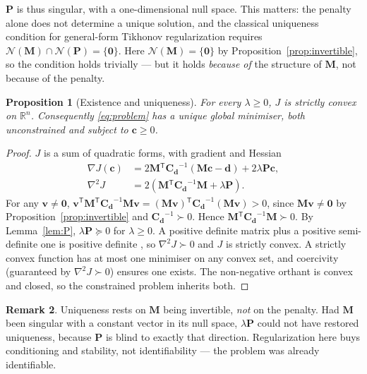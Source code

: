 \documentclass[11pt]{article}
\newcommand{\cvec}{\ensuremath{\mathbf{c}}\xspace}
\newcommand{\dvec}{\ensuremath{\mathbf{d}}\xspace}
\newcommand{\Mmat}{\ensuremath{\mathbf{M}}\xspace}
\newcommand{\Pmat}{\ensuremath{\mathbf{P}}\xspace}
\newcommand{\Cd}{\ensuremath{\mathbf{C}_{\mathbf{d}}}\xspace}
\newcommand{\Reals}{\ensuremath{\mathbb{R}}\xspace}
\newcommand{\transpose}{\ensuremath{^{\mathsf{T}}}}
\newtheorem{theorem}{Proposition}
\theoremstyle{definition}
\newtheorem{remark}[theorem]{Remark}
\begin{document}
\noindent $\Pmat$ is thus singular, with a one-dimensional null space. This matters: the
penalty alone does not determine a unique solution, and the classical uniqueness condition for
general-form Tikhonov regularization \parencite{elden_algorithms_1977,
hansen_rank-deficient_1998} requires
$\mathcal{N}(\Mmat) \cap \mathcal{N}(\Pmat) = \{\bm{0}\}$. Here $\mathcal{N}(\Mmat) =
\{\bm{0}\}$ by Proposition~\ref{prop:invertible}, so the condition holds trivially --- but it holds
\textit{because of} the structure of $\Mmat$, not because of the penalty.

\begin{theorem}[Existence and uniqueness]\label{prop:unique}
For every $\lambda \ge 0$, $J$ is strictly convex on $\Reals^n$. Consequently
\eqref{eq:problem} has a unique global minimiser, both unconstrained and subject to
$\cvec \ge 0$.
\end{theorem}

\begin{proof}
$J$ is a sum of quadratic forms, with gradient and Hessian
\begin{align}
  \nabla J(\cvec) &= 2\Mmat\transpose\Cd^{-1}(\Mmat\cvec - \dvec) + 2\lambda\Pmat\cvec ,
  \label{eq:grad}\\
  \nabla^2 J &= 2\left(\Mmat\transpose\Cd^{-1}\Mmat + \lambda\Pmat\right) .
  \label{eq:hess}
\end{align}
For any $\mathbf{v} \ne \bm{0}$, $\mathbf{v}\transpose\Mmat\transpose\Cd^{-1}\Mmat\mathbf{v} =
(\Mmat\mathbf{v})\transpose\Cd^{-1}(\Mmat\mathbf{v}) > 0$, since $\Mmat\mathbf{v} \ne \bm{0}$
by Proposition~\ref{prop:invertible} and $\Cd^{-1} \succ 0$. Hence
$\Mmat\transpose\Cd^{-1}\Mmat \succ 0$. By Lemma~\ref{lem:P}, $\lambda\Pmat \succeq 0$ for
$\lambda \ge 0$. A positive definite matrix plus a positive semi-definite one is positive
definite \parencite{horn_matrix_2012}, so $\nabla^2 J \succ 0$ and $J$ is strictly convex. A
strictly convex function has at most one minimiser on any convex set, and coercivity
(guaranteed by $\nabla^2 J \succ 0$) ensures one exists. The non-negative orthant is convex and
closed, so the constrained problem inherits both.
\end{proof}

\begin{remark}
Uniqueness rests on $\Mmat$ being invertible, \textit{not} on the penalty. Had $\Mmat$ been
singular with a constant vector in its null space, $\lambda\Pmat$ could not have restored
uniqueness, because $\Pmat$ is blind to exactly that direction. Regularization here buys
conditioning and stability, not identifiability --- the problem was already identifiable.
\end{remark}
\end{document}
